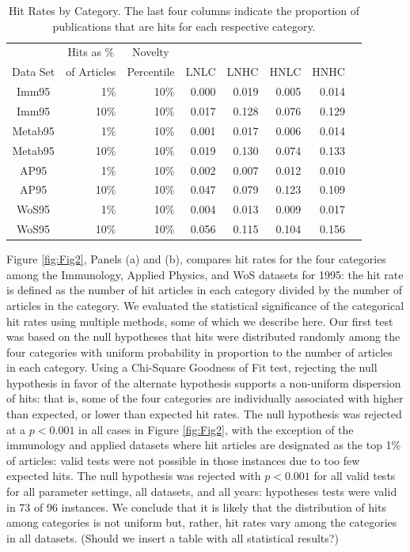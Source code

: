 \documentclass[NETN]{stjour}
\begin{document}
\begin{table}%
\centering
\caption[Hit Rates]{Hit Rates by Category. The last four columns indicate the proportion of publications that are hits for each respective category.} \label{Tab:HitRate}
\begin{tabular}{crrrrrrr}
& \multicolumn{1}{c}{Hits as \%} & \multicolumn{1}{c}{Novelty}  &  &  &  &  \\ Data Set & \multicolumn{1}{c}{of Articles} & \multicolumn{1}{c}{Percentile} & \multicolumn{1}{c}{LNLC} & \multicolumn{1}{c}{LNHC} & \multicolumn{1}{c}{HNLC} & \multicolumn{1}{c}{HNHC} \\ \hline
   
Imm95&1\%&10\%& 0.000& 0.019& 0.005& 0.014 \\ 
Imm95&10\%&10\%& 0.017& 0.128& 0.076& 0.129 \\ 
Metab95&1\%&10\%& 0.001& 0.017& 0.006& 0.014 \\ 
Metab95&10\%&10\%& 0.019& 0.130& 0.074& 0.133 \\ 
AP95&1\%&10\%& 0.002& 0.007& 0.012& 0.010 \\ 
AP95&10\%&10\%& 0.047& 0.079& 0.123& 0.109 \\ 
WoS95&1\%&10\%& 0.004& 0.013& 0.009& 0.017 \\ 
WoS95&10\%&10\%& 0.056& 0.115& 0.104& 0.156 \\ \hline

\end{tabular}
\end{table}

Figure \ref{fig:Fig2}, Panels (a) and (b), compares hit rates for the four categories among the Immunology, Applied Physics, and WoS datasets for 1995: the hit rate is defined as the number of hit articles in each category divided by the number of articles in the category. We evaluated the statistical significance of the categorical hit rates using multiple methods, some of which we describe here.  Our first test was based on the null hypotheses that hits were distributed randomly among the four categories with uniform probability in proportion to the number of articles in each category. Using a Chi-Square Goodness of Fit test, rejecting the null hypothesis in favor of the alternate hypothesis supports a non-uniform dispersion of hits: that is, some of the four categories are individually associated with higher than expected, or lower than expected hit rates. The null hypothesis was rejected at a $p<0.001$ in all cases in  Figure \ref{fig:Fig2}, with the exception of the immunology and applied datasets where hit articles are designated as the top 1\% of articles: valid tests were not possible in those instances due to too few expected hits. The null hypothesis was rejected with $p<0.001$ for all valid tests for all parameter settings, all datasets, and all years: hypotheses tests were valid in 73 of 96 instances. We conclude that it is likely that the distribution of hits among categories is not uniform but, rather, hit rates vary among the categories in all datasets. (Should we insert a table with all statistical results?)
\end{document}
